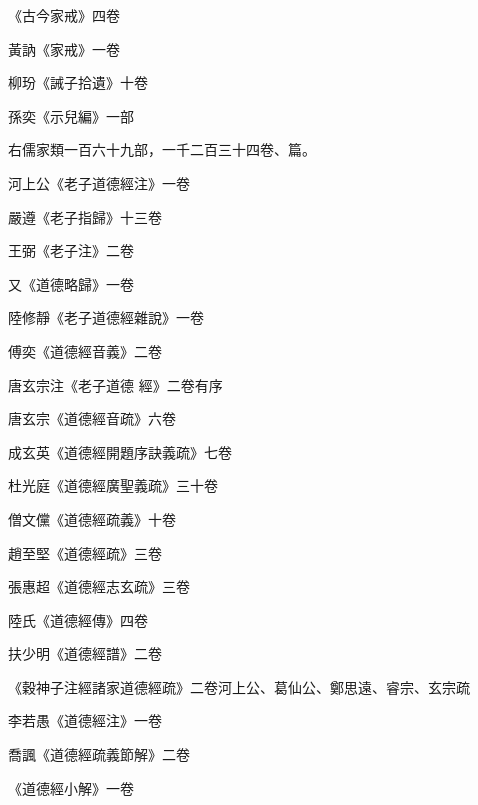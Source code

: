 \begin{pinyinscope}
 《古今家戒》四卷



 黃訥《家戒》一卷



 柳玢《誡子拾遺》十卷



 孫奕《示兒編》一部



 右儒家類一百六十九部，一千二百三十四卷、篇。



 河上公《老子道德經注》一卷



 嚴遵《老子指歸》十三卷



 王弼《老子注》二卷



 又《道德略歸》一卷



 陸修靜《老子道德經雜說》一卷



 傅奕《道德經音義》二卷



 唐玄宗注《老子道德
 經》二卷有序



 唐玄宗《道德經音疏》六卷



 成玄英《道德經開題序訣義疏》七卷



 杜光庭《道德經廣聖義疏》三十卷



 僧文儻《道德經疏義》十卷



 趙至堅《道德經疏》三卷



 張惠超《道德經志玄疏》三卷



 陸氏《道德經傳》四卷



 扶少明《道德經譜》二卷



 《穀神子注經諸家道德經疏》二卷河上公、葛仙公、鄭思遠、睿宗、玄宗疏



 李若愚《道德經注》一卷



 喬諷《道德經疏義節解》二卷



 《道德經小解》一卷




\end{pinyinscope}
